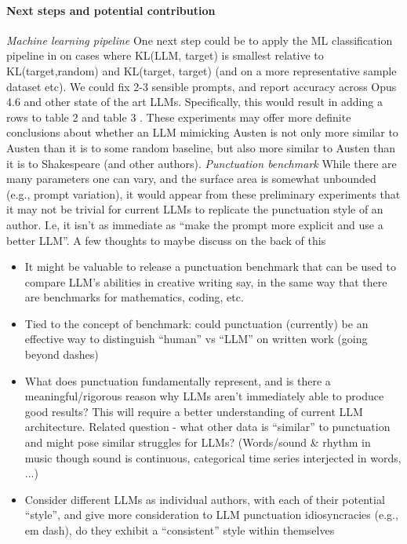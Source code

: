 \documentclass{article}
\begin{document}
\paragraph{Next steps and potential contribution}


\emph{Machine learning pipeline} One next step could be to apply the ML classification pipeline in \cite{punctuation_2021} on cases where KL(LLM, target) is smallest relative to KL(target,random) and KL(target, target) (and on a more representative sample dataset etc). We could fix 2-3 sensible prompts, and report accuracy across Opus 4.6 and other state of the art LLMs. Specifically, this would result in adding a rows to table 2 and table 3 \cite{punctuation_2021}. These experiments may offer more definite conclusions about whether an LLM mimicking Austen is not only more similar to Austen than it is to some random baseline, but also more similar to Austen than it is to Shakespeare (and other authors). 
\newline
\emph{Punctuation benchmark} While there are many parameters one can vary, and the surface area is somewhat unbounded (e.g., prompt variation), it would appear from these preliminary experiments that it may not be trivial for current LLMs to replicate the punctuation style of an author. I.e, it isn’t as immediate as “make the prompt more explicit and use a better LLM”. A few thoughts to maybe discuss on the back of this
\begin{itemize}
\item It might be valuable to release a punctuation benchmark that can be used to compare LLM's abilities in creative writing say, in the same way that there are benchmarks for mathematics, coding, etc. 
\item Tied to the concept of benchmark: could punctuation (currently) be an effective way to distinguish ``human” vs ``LLM” on written work (going beyond dashes)
\item What does punctuation fundamentally represent, and is there a meaningful/rigorous reason why LLMs aren’t immediately able to produce good results? This will require a better understanding of current LLM architecture. Related question - what other data is ``similar'' to punctuation and might pose similar struggles for LLMs? (Words/sound \& rhythm in music though sound is continuous, categorical time series interjected in words, ...)
\item Consider different LLMs as individual authors, with each of their potential ``style'', and give more consideration to LLM punctuation idiosyncracies (e.g., em dash), do they exhibit a ``consistent'' style within themselves
\end{itemize}
\newline
\end{document}
